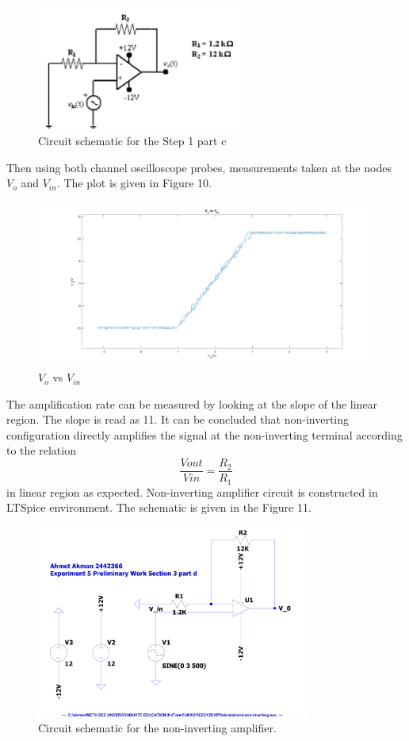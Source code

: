 \documentclass[letterpaper,12pt]{article}
\begin{document}
\begin{figure}[H]
	\centering
   \includegraphics[width=0.6\textwidth]{circuit4.png}
   \caption{Circuit schematic for the Step 1 part c}
\end{figure} 
Then using both channel oscilloscope probes, measurements taken at the nodes \(V_{o} \) and \( V_{in}\). The plot is given in Figure 10.

\begin{figure}[H]
	\centering
   \includegraphics[width=1\textwidth]{e_1_c.png}
   \caption{\(V_{o} \) vs \( V_{in}\)}
\end{figure} 
The amplification rate can be measured by looking at the slope of the linear region. The slope is read as 11. It can be concluded that non-inverting configuration directly amplifies the signal at the non-inverting terminal according to the relation \[\frac{V{out}}{V{in}} = \frac{R_2}{R_1}\] in linear region as expected.
Non-inverting amplifier circuit is constructed in LTSpice environment. The schematic is given in the Figure 11.
\begin{figure}[H]
	\centering
   \includegraphics[width=0.8\textwidth]{non-inverting_SCH.pdf}
   \caption{Circuit schematic for the non-inverting amplifier.}
\end{figure} 
\end{document}
